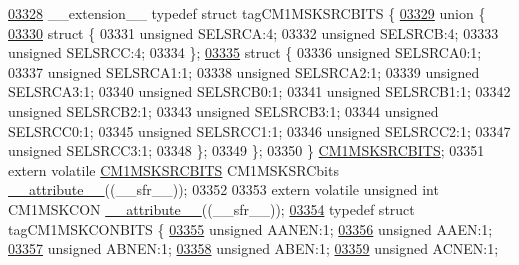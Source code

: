 \begin{DoxyCode}
\hypertarget{a00015_source_l03328}{}\hyperlink{a00014}{03328} \_\_extension\_\_ \textcolor{keyword}{typedef} \textcolor{keyword}{struct }tagCM1MSKSRCBITS \{
\hypertarget{a00015_source_l03329}{}\hyperlink{a00015}{03329}   \textcolor{keyword}{union }\{
\hypertarget{a00015_source_l03330}{}\hyperlink{a00015}{03330}     \textcolor{keyword}{struct }\{
03331       \textcolor{keywordtype}{unsigned} SELSRCA:4;
03332       \textcolor{keywordtype}{unsigned} SELSRCB:4;
03333       \textcolor{keywordtype}{unsigned} SELSRCC:4;
03334     \};
\hypertarget{a00015_source_l03335}{}\hyperlink{a00015}{03335}     \textcolor{keyword}{struct }\{
03336       \textcolor{keywordtype}{unsigned} SELSRCA0:1;
03337       \textcolor{keywordtype}{unsigned} SELSRCA1:1;
03338       \textcolor{keywordtype}{unsigned} SELSRCA2:1;
03339       \textcolor{keywordtype}{unsigned} SELSRCA3:1;
03340       \textcolor{keywordtype}{unsigned} SELSRCB0:1;
03341       \textcolor{keywordtype}{unsigned} SELSRCB1:1;
03342       \textcolor{keywordtype}{unsigned} SELSRCB2:1;
03343       \textcolor{keywordtype}{unsigned} SELSRCB3:1;
03344       \textcolor{keywordtype}{unsigned} SELSRCC0:1;
03345       \textcolor{keywordtype}{unsigned} SELSRCC1:1;
03346       \textcolor{keywordtype}{unsigned} SELSRCC2:1;
03347       \textcolor{keywordtype}{unsigned} SELSRCC3:1;
03348     \};
03349   \};
03350 \} \hyperlink{a00014_d7/df2/a00312}{CM1MSKSRCBITS};
03351 \textcolor{keyword}{extern} \textcolor{keyword}{volatile} \hyperlink{a00014_d7/df2/a00312}{CM1MSKSRCBITS} CM1MSKSRCbits \hyperlink{a00015_a493c46f03454991ccc5aa7a6e1dfb2a7}{\_\_attribute\_\_}((\_\_sfr\_\_));
03352 
03353 \textcolor{keyword}{extern} \textcolor{keyword}{volatile} \textcolor{keywordtype}{unsigned} \textcolor{keywordtype}{int}  CM1MSKCON \hyperlink{a00015_a493c46f03454991ccc5aa7a6e1dfb2a7}{\_\_attribute\_\_}((\_\_sfr\_\_));
\hypertarget{a00015_source_l03354}{}\hyperlink{a00014}{03354} \textcolor{keyword}{typedef} \textcolor{keyword}{struct }tagCM1MSKCONBITS \{
\hypertarget{a00015_source_l03355}{}\hyperlink{a00014_a6ea89b9cbdf0bbde3ec8147513e70fa0}{03355}   \textcolor{keywordtype}{unsigned} AANEN:1;
\hypertarget{a00015_source_l03356}{}\hyperlink{a00014_a58bba29325ff11212a73bae4b2b1a707}{03356}   \textcolor{keywordtype}{unsigned} AAEN:1;
\hypertarget{a00015_source_l03357}{}\hyperlink{a00014_a1b2c756ac7255e490499f85cb2d746f3}{03357}   \textcolor{keywordtype}{unsigned} ABNEN:1;
\hypertarget{a00015_source_l03358}{}\hyperlink{a00014_abae9997777bf70f8cf9132c18db1e83d}{03358}   \textcolor{keywordtype}{unsigned} ABEN:1;
\hypertarget{a00015_source_l03359}{}\hyperlink{a00014_af825e9ea0f6690d86c6ca9bda2e82eb1}{03359}   \textcolor{keywordtype}{unsigned} ACNEN:1;

\end{DoxyCode}
